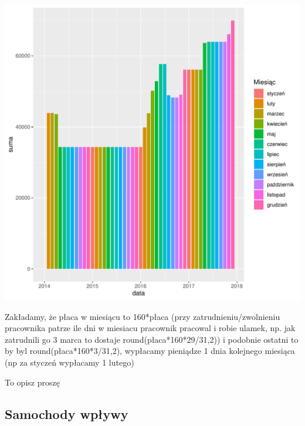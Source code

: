 \documentclass{article}\usepackage[]{graphicx}\usepackage[]{xcolor}
\makeatletter
\def\maxwidth{ %
  \ifdim\Gin@nat@width>\linewidth
    \linewidth
  \else
    \Gin@nat@width
  \fi
}
\newenvironment{knitrout}{}{} %
\makeatother
\begin{document}
\begin{knitrout}
\color{fgcolor}

{\centering \includegraphics[width=\maxwidth]{figure/unnamed-chunk-5-1} 

}


\end{knitrout}

Zakładamy, że płaca w miesiącu to 160*płaca (przy zatrudnieniu/zwolnieniu pracownika patrze ile dni w miesiacu pracownik pracowal i robie ulamek, np. jak zatrudnili go 3 marca to dostaje round(płaca*160*29/31,2)) i podobnie ostatni to by byl round(płaca*160*3/31,2), wypłacamy pieniądze 1 dnia kolejnego miesiąca (np za styczeń wypłacamy 1 lutego)

{\color{red} To opisz proszę}

\subsection{Samochody wpływy}
\end{document}
